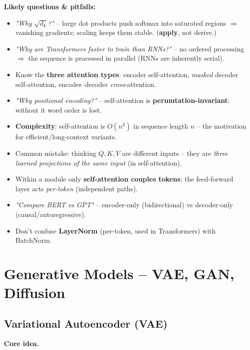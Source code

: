 \documentclass[10pt,a4paper]{article}
\begin{document}
	\begin{examtipbox}
		\textbf{Likely questions \& pitfalls:}
		\begin{itemize}[leftmargin=*]
			\item \emph{"Why $\sqrt{d_k}$?"} -- large dot products push softmax into saturated regions $\Rightarrow$ vanishing gradients; scaling keeps them stable. (\textbf{apply}, not derive.)
			\item \emph{"Why are Transformers faster to train than RNNs?"} -- no ordered processing $\Rightarrow$ the sequence is processed in parallel (RNNs are inherently serial).
			\item Know the \textbf{three attention types}: encoder self-attention, \emph{masked} decoder self-attention, encoder--decoder \emph{cross}-attention.
			\item \emph{"Why positional encoding?"} -- self-attention is \textbf{permutation-invariant}; without it word order is lost.
			\item \textbf{Complexity}: self-attention is $O(n^2)$ in sequence length $n$ -- the motivation for efficient/long-context variants.
			\item Common mistake: thinking $Q,K,V$ are different inputs -- they are \emph{three learned projections of the same input} (in self-attention).
			\item Within a module only \textbf{self-attention couples tokens}; the feed-forward layer acts \emph{per-token} (independent paths).
			\item \emph{"Compare BERT vs GPT"} -- encoder-only (bidirectional) vs decoder-only (causal/autoregressive).
			\item Don't confuse \textbf{LayerNorm} (per-token, used in Transformers) with BatchNorm.
		\end{itemize}
	\end{examtipbox}
	
	\section{Generative Models -- VAE, GAN, Diffusion}
	
	\subsection{Variational Autoencoder (VAE)}

	\textbf{Core idea.}
\end{document}
